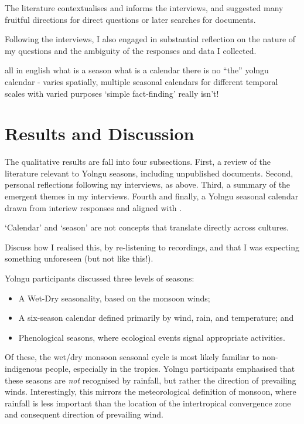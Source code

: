The literature contextualises and informs the interviews, and suggested many fruitful
directions for direct questions or later searches for documents.


Following the interviews, I also engaged in substantial reflection on the nature of
my questions and the ambiguity of the responses and data I collected.

all in english
what is a season
what is a calendar
there is no ``the'' yolngu calendar - varies spatially, multiple seasonal calendars for different temporal scales with varied purposes
`simple fact-finding' really isn't!



\section{Results and Discussion}

The qualitative results are fall into four subsections.
First, a review of the literature relevant to Yolngu seasons, including unpublished documents.
Second, personal reflections following my interviews, as above.
Third, a summary of the emergent themes in my interviews.
Fourth and finally, a Yolngu seasonal calendar drawn from interiew responses and aligned with \citet{davis1989}.




`Calendar' and `season' are not concepts that translate directly across cultures. 

Discuss how I realised this, by re-listening to recordings, and that I was expecting something unforeseen (but not like this!).  

Yolngu participants discussed three levels of seasons:
\begin{itemize}
\item A Wet-Dry seasonality, based on the monsoon winds;
\item A six-season calendar defined primarily by wind, rain, and temperature; and
\item Phenological seasons, where ecological events signal appropriate activities.
\end{itemize}

Of these, the wet/dry monsoon seasonal cycle is most likely familiar to non-indigenous people,
especially in the tropics.  Yolngu participants emphasised that these seasons
are \emph{not} recognised by rainfall, but rather the direction of prevailing winds.
Interestingly, this mirrors the meteorological definition of monsoon, where rainfall is less important than
the location of the intertropical convergence zone and consequent direction of prevailing wind.




